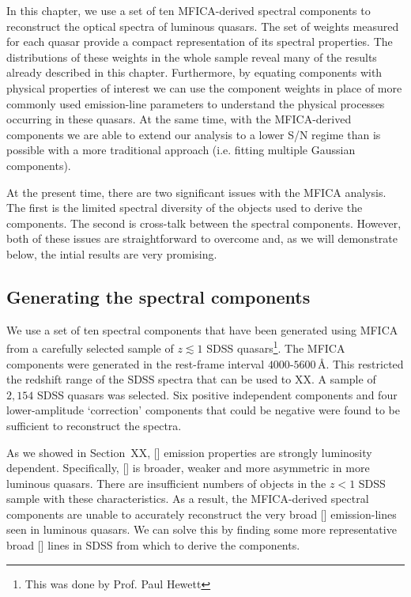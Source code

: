 In this chapter, we use a set of ten MFICA-derived spectral components to reconstruct the optical spectra of luminous quasars.
The set of weights measured for each quasar provide a compact representation of its spectral properties.  
The distributions of these weights in the whole sample reveal many of the results already described in this chapter.
Furthermore, by equating components with physical properties of interest we can use the component weights in place of more commonly used emission-line parameters to understand the physical processes occurring in these quasars. 
At the same time, with the MFICA-derived components we are able to extend our analysis to a lower S/N regime than is possible with a more traditional approach (i.e. fitting multiple Gaussian components).

At the present time, there are two significant issues with the MFICA analysis. 
The first is the limited spectral diversity of the objects used to derive the components. 
The second is cross-talk between the spectral components.
However, both of these issues are straightforward to overcome and, as we will demonstrate below, the intial results are very promising.   

\subsection{Generating the spectral components}

We use a set of ten spectral components that have been generated using MFICA from a carefully selected sample of $z \lesssim 1$ SDSS quasars\footnote{This was done by Prof. Paul Hewett}.
The MFICA components were generated in the rest-frame interval $4000$-$5600$\,\AA.
This restricted the redshift range of the SDSS spectra that can be used to XX.  
A sample of $2,154$ SDSS quasars was selected.
Six positive independent components and four lower-amplitude `correction' components that could be negative were found to be sufficient to reconstruct the spectra. 

As we showed in Section~XX, [] emission properties are strongly luminosity dependent.
Specifically, [] is broader, weaker and more asymmetric in more luminous quasars.  
There are insufficient numbers of objects in the $z<1$ SDSS sample with these characteristics. 
As a result, the MFICA-derived spectral components are unable to accurately reconstruct the very broad [] emission-lines seen in luminous quasars. 
We can solve this by finding some more representative broad [] lines in SDSS from which to derive the components. 

